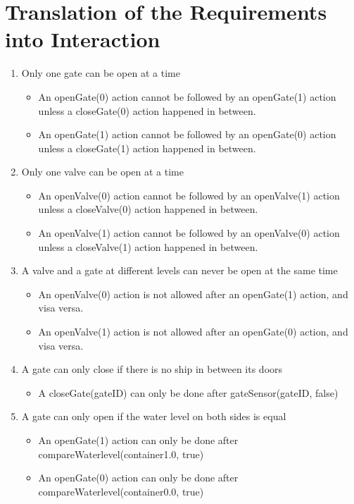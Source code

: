\section{Translation of the Requirements into Interaction}
\begin{enumerate}
	\item Only one gate can be open at a time	
		\begin{itemize}
			\item An openGate(0) action cannot be followed by an openGate(1) action unless a closeGate(0) action happened in between.
			\item An openGate(1) action cannot be followed by an openGate(0) action unless a closeGate(1) action happened in between.
			
		\end{itemize}
	
	\item Only one valve can be open at a time	
		\begin{itemize}
			\item An openValve(0) action cannot be followed by an openValve(1) action unless a closeValve(0) action happened in between.
			\item An openValve(1) action cannot be followed by an openValve(0) action unless a closeValve(1) action happened in between.
		\end{itemize}
	
	\item A valve and a gate at different levels can never be open at the same time
		\begin{itemize}
			\item An openValve(0) action is not allowed after an openGate(1) action, and visa versa.
			\item An openValve(1) action is not allowed after an openGate(0) action, and visa versa.
		\end{itemize}
	
	\item A gate can only close if there is no ship in between its doors
		\begin{itemize}
			\item A closeGate(gateID) can only be done after gateSensor(gateID, false)
		\end{itemize}
	
	\item A gate can only open if the water level on both sides is equal
		\begin{itemize}
			\item An openGate(1) action can only be done after compareWaterlevel(container1.0, true)
			\item An openGate(0) action can only be done after compareWaterlevel(container0.0, true)
		\end{itemize}
	

\end{enumerate}
